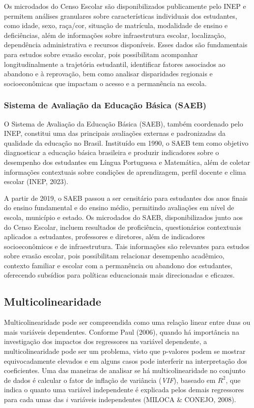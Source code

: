 \documentclass[english, spanish, brazilian]{RBIEarticle} %
\begin{document}
Os microdados do Censo Escolar são disponibilizados publicamente pelo INEP e permitem análises granulares sobre características individuais dos estudantes, como idade, sexo, raça/cor, situação de matrícula, modalidade de ensino e deficiências, além de informações sobre infraestrutura escolar, localização, dependência administrativa e recursos disponíveis. Esses dados são fundamentais para estudos sobre evasão escolar, pois possibilitam acompanhar longitudinalmente a trajetória estudantil, identificar fatores associados ao abandono e à reprovação, bem como analisar disparidades regionais e socioeconômicas que impactam o acesso e a permanência na escola.

\subsubsection{Sistema de Avaliação da Educação Básica (SAEB)}
O Sistema de Avaliação da Educação Básica (SAEB), também coordenado pelo INEP, constitui uma das principais avaliações externas e padronizadas da qualidade da educação no Brasil. Instituído em 1990, o SAEB tem como objetivo diagnosticar a educação básica brasileira e produzir indicadores sobre o desempenho dos estudantes em Língua Portuguesa e Matemática, além de coletar informações contextuais sobre condições de aprendizagem, perfil docente e clima escolar (INEP, 2023).

A partir de 2019, o SAEB passou a ser censitário para estudantes dos anos finais do ensino fundamental e do ensino médio, permitindo avaliações em nível de escola, município e estado. Os microdados do SAEB, disponibilizados junto aos do Censo Escolar, incluem resultados de proficiência, questionários contextuais aplicados a estudantes, professores e diretores, além de indicadores socioeconômicos e de infraestrutura. Tais informações são relevantes para estudos sobre evasão escolar, pois possibilitam relacionar desempenho acadêmico, contexto familiar e escolar com a permanência ou abandono dos estudantes, oferecendo subsídios para políticas educacionais mais direcionadas e eficazes.

\subsection{Multicolinearidade}

Multicolinearidade pode ser compreendida como uma relação linear entre duas ou mais variáveis dependentes. Conforme Paul (2006), quando há importância na investigação dos impactos dos regressores na variável dependente, a multicolinearidade pode ser um problema, visto que p-valores podem se mostrar equivocadamente elevados e em alguns casos pode interferir na interpretação dos coeficientes. Uma das maneiras de analisar se há multicolinearidade no conjunto de dados é calcular o fator de inflação de variância (\textit{VIF}), baseado em $R^2$, que indica o quanto uma variável independente é explicada pelos demais regressores para cada umas das $i$ variáveis independentes (MILOCA \& CONEJO, 2008).
\end{document}
